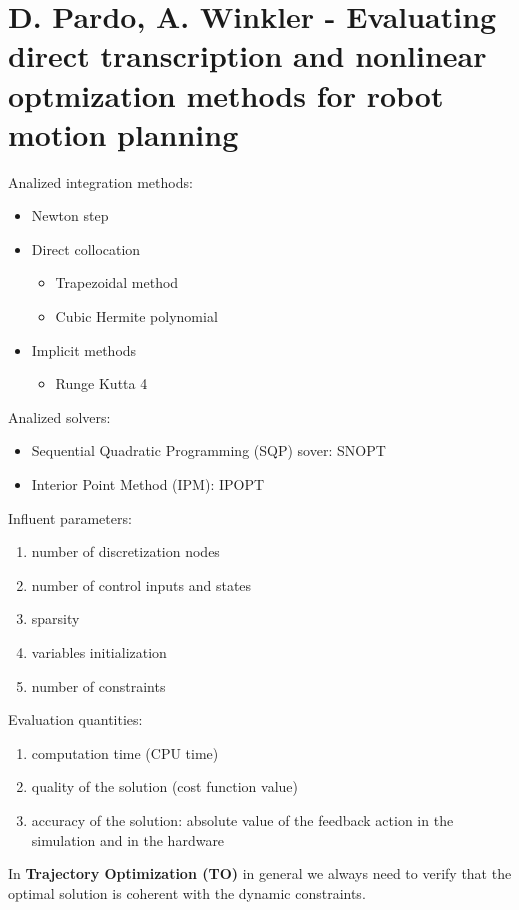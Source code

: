 \section{D. Pardo, A. Winkler - Evaluating direct transcription and nonlinear optmization methods for robot motion planning}

Analized integration methods:
\begin{itemize}
\item Newton step
\item Direct collocation
\begin{itemize}
\item Trapezoidal method
\item Cubic Hermite polynomial
\end{itemize}
\item Implicit methods
\begin{itemize}
\item Runge Kutta 4
\end{itemize}
\end{itemize}

Analized solvers:
\begin{itemize}
\item Sequential Quadratic Programming (SQP) sover: SNOPT
\item Interior Point Method (IPM): IPOPT
\end{itemize}

Influent parameters:
\begin{enumerate}
\item number of discretization nodes
\item number of control inputs and states
\item sparsity
\item variables initialization
\item number of constraints
\end{enumerate}

Evaluation quantities:
\begin{enumerate}
\item computation time (CPU time)
\item quality of the solution (cost function value)
\item accuracy of the solution: absolute value of the feedback action in the simulation and in the hardware
\end{enumerate}
In \textbf{Trajectory Optimization (TO)} in general we always need to verify that the optimal solution is coherent with the dynamic constraints.
